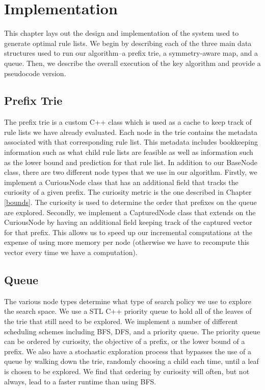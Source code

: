 \documentclass[]{article}
\theoremstyle{definition}
\begin{document}
\section{Implementation}

This chapter lays out the design and implementation of the system used to generate optimal rule lists. 
We begin by describing each of the three main data structures used to run our algorithm--a prefix trie, a symmetry-aware map, and a queue. 
Then, we describe the overall execution of the key algorithm and provide a pseudocode version.

\subsection{Prefix Trie}
The prefix trie is a custom C++ class which is used as a cache to keep track of rule lists we have already evaluated. 
Each node in the trie contains the metadata associated with that corresponding rule list. 
This metadata includes bookkeeping information such as what child rule lists are feasible as well as information such as the lower bound and prediction for that rule list.
In addition to our BaseNode class, there are two different node types that we use in our algorithm.
Firstly, we implement a CuriousNode class that has an additional field that tracks the curiosity of a given prefix.
The curiosity metric is the one described in Chapter \ref{bounds}.
The curiosity is used to determine the order that prefixes on the queue are explored.
Secondly, we implement a CapturedNode class that extends on the CuriousNode by having an additional field keeping track of the captured vector for that prefix.
This allows us to speed up our incremental computations at the expense of using more memory per node (otherwise we have to recompute this vector every time we have a computation).

\subsection{Queue}
The various node types determine what type of search policy we use to explore the search space.
We use a STL C++ priority queue to hold all of the leaves of the trie that still need to be explored.
We implement a number of different scheduling schemes including BFS, DFS, and a priority queue.
The priority queue can be ordered by curiosity, the objective of a prefix, or the lower bound of a prefix.
We also have a stochastic exploration process that bypasses the use of a queue by walking down the trie, randomly choosing a child each time, until a leaf is chosen to be explored.
We find that ordering by curiosity will often, but not always, lead to a faster runtime than using BFS.
\end{document}

